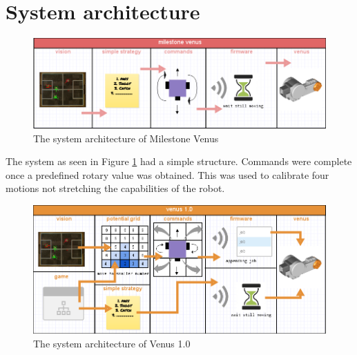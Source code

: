 \documentclass[a4paper,12pt]{article}
\begin{document}
\cleardoublepage
{}
\tableofcontents
\cleardoublepage
{}

\newpage


\section{System architecture}

\begin{figure}
  \begin{center}
    \includegraphics[scale=0.4]{arch1.png}
  \end{center}
  \caption{The system architecture of Milestone Venus}
  \vspace{20pt}
  \label{fig:milestone}
\end{figure}

The system as seen in Figure \ref{fig:milestone} had a simple structure. Commands were complete once a predefined rotary value was obtained. This was used to calibrate four motions not stretching the capabilities of the robot.

\begin{figure}
  \begin{center}
\includegraphics[scale=0.4]{arch2.png}
\end{center}
	\caption{The system architecture of Venus 1.0}
	\vspace{20pt}
	\label{fig:venus1}
\end{figure}
\end{document}
